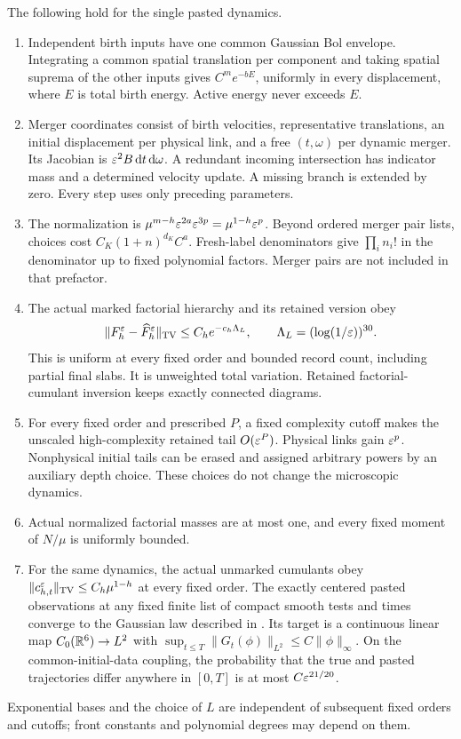 \begin{proposition}\label{prop:imports}
The following hold for the single pasted dynamics.
\begin{enumerate}[label=(\roman*)]
\item Independent birth inputs have one common Gaussian Bol envelope.
Integrating a common spatial translation per component and taking spatial
suprema of the other inputs gives $C^m e^{-bE}$, uniformly in every
displacement, where $E$ is total birth energy. Active energy never exceeds
$E$.
\item Merger coordinates consist of birth velocities, representative
translations, an initial displacement per physical link, and a free
$(t,\omega)$ per dynamic merger. Its Jacobian is $\varepsilon^2B\,\mathrm d t\,\mathrm d\omega$.
A redundant incoming intersection has indicator mass and a determined
velocity update. A missing branch is extended by zero. Every step uses
only preceding parameters.
\item The normalization is
$\mu^{m-h}\varepsilon^{2a}\varepsilon^{3p}=\mu^{1-h}\varepsilon^p$.
Beyond ordered merger pair lists, choices cost
$C_K(1+n)^{d_K}C^a$. Fresh-label denominators give $\prod_i n_i!$ in the
denominator up to fixed polynomial factors. Merger pairs are not included
in that prefactor.
\item The actual marked factorial hierarchy and its retained version obey
\[
 \|F_h^\varepsilon-\widehat F_h^\varepsilon\|_{\mathrm{TV}}
       \leq C_h e^{-c_h\Lambda_L},\qquad
 \Lambda_L=(\log(1/\varepsilon))^{30}.
\]
This is uniform at every fixed order and bounded record count, including
partial final slabs. It is unweighted total variation.
Retained factorial-cumulant inversion keeps exactly connected diagrams.
\item For every fixed order and prescribed $P$, a fixed complexity cutoff
makes the unscaled high-complexity retained tail $O(\varepsilon^P)$.
Physical links gain $\varepsilon^p$. Nonphysical initial tails can be erased and
assigned arbitrary powers by an auxiliary depth choice.
These choices do not change the microscopic dynamics.
\item Actual normalized factorial masses are at most one, and every
fixed moment of $N/\mu$ is uniformly bounded.
\item For the same dynamics, the actual unmarked cumulants obey
$\|c_{h,t}^\varepsilon\|_{\mathrm{TV}}\leq C_h\mu^{1-h}$ at every fixed order.
The exactly centered pasted observations at any fixed finite list of
compact smooth tests and times converge to the Gaussian law described
in . Its target is a continuous linear map
$C_0(\mathbb R^6)\to L^2$ with
$\sup_{t\leq T}\|G_t(\phi)\|_{L^2}\leq C\|\phi\|_\infty$.
On the common-initial-data coupling, the probability that the true and
pasted trajectories differ anywhere in $[0,T]$ is at most
$C\varepsilon^{21/20}$.
\end{enumerate}
Exponential bases and the choice of $L$ are independent of subsequent
fixed orders and cutoffs; front constants and polynomial degrees may
depend on them.
\end{proposition}

